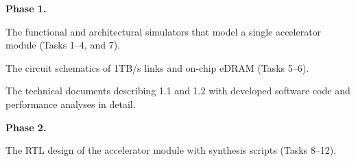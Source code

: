 


\noindent
\textbf{Phase 1.}

 The functional and architectural simulators that model a single accelerator module (Tasks 1--4, and 7).

 The circuit schematics of 1TB/s links and on-chip eDRAM (Tasks 5--6). 

 The technical documents describing 1.1 and 1.2 with developed software code and performance analyses in detail.

\vspace{3pt}
\noindent
\textbf{Phase 2.}

 The RTL design of the accelerator module with synthesis scripts (Tasks 8--12).

